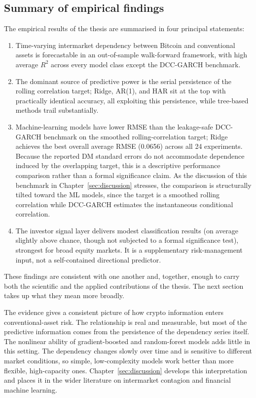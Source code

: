 \subsection{Summary of empirical findings}

The empirical results of the thesis are summarised in four principal statements:

\begin{enumerate}
\item Time-varying intermarket dependency between Bitcoin and conventional assets is forecastable in an out-of-sample walk-forward framework, with high average $R^2$ across every model class except the DCC-GARCH benchmark.
    \item The dominant source of predictive power is the serial persistence of the rolling correlation target; Ridge, AR(1), and HAR sit at the top with practically identical accuracy, all exploiting this persistence, while tree-based methods trail substantially.
    \item Machine-learning models have lower RMSE than the leakage-safe DCC-GARCH benchmark on the smoothed rolling-correlation target; Ridge achieves the best overall average RMSE (0.0656) across all 24 experiments. Because the reported DM standard errors do not accommodate dependence induced by the overlapping target, this is a descriptive performance comparison rather than a formal significance claim. As the discussion of this benchmark in Chapter~\ref{sec:discussion} stresses, the comparison is structurally tilted toward the ML models, since the target is a smoothed rolling correlation while DCC-GARCH estimates the instantaneous conditional correlation.
    \item The investor signal layer delivers modest classification results (on average slightly above chance, though not subjected to a formal significance test), strongest for broad equity markets. It is a supplementary risk-management input, not a self-contained directional predictor.
\end{enumerate}

These findings are consistent with one another and, together, enough to carry both the scientific and the applied contributions of the thesis. The next section takes up what they mean more broadly.

The evidence gives a consistent picture of how crypto information enters conventional-asset risk. The relationship is real and measurable, but most of the predictive information comes from the persistence of the dependency series itself. The nonlinear ability of gradient-boosted and random-forest models adds little in this setting. The dependency changes slowly over time and is sensitive to different market conditions, so simple, low-complexity models work better than more flexible, high-capacity ones. Chapter~\ref{sec:discussion} develops this interpretation and places it in the wider literature on intermarket contagion and financial machine learning.
